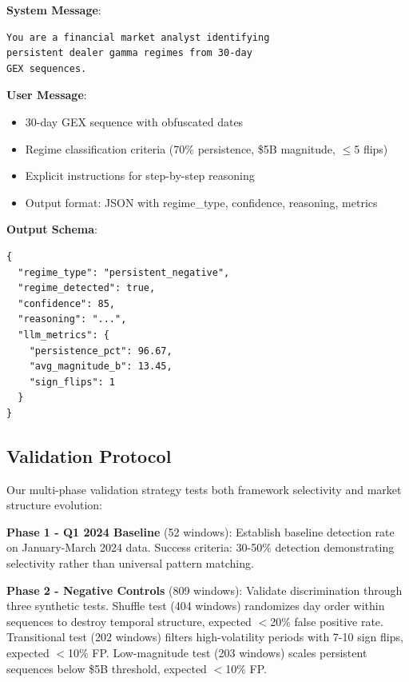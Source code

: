 \noindent\textbf{System Message}:
\begin{verbatim}
You are a financial market analyst identifying
persistent dealer gamma regimes from 30-day
GEX sequences.
\end{verbatim}

\vspace{0.2cm}

\noindent\textbf{User Message}:
\begin{itemize}
\item 30-day GEX sequence with obfuscated dates
\item Regime classification criteria (70\% persistence, \$5B magnitude, $\leq$5 flips)
\item Explicit instructions for step-by-step reasoning
\item Output format: JSON with regime\_type, confidence, reasoning, metrics
\end{itemize}

\vspace{0.2cm}

\noindent\textbf{Output Schema}:
\begin{verbatim}
{
  "regime_type": "persistent_negative",
  "regime_detected": true,
  "confidence": 85,
  "reasoning": "...",
  "llm_metrics": {
    "persistence_pct": 96.67,
    "avg_magnitude_b": 13.45,
    "sign_flips": 1
  }
}
\end{verbatim}

\subsection{Validation Protocol}

Our multi-phase validation strategy tests both framework selectivity and market structure evolution:

\vspace{0.2cm}

\noindent\textbf{Phase 1 - Q1 2024 Baseline} (52 windows): Establish baseline detection rate on January-March 2024 data. Success criteria: 30-50\% detection demonstrating selectivity rather than universal pattern matching.

\vspace{0.2cm}

\noindent\textbf{Phase 2 - Negative Controls} (809 windows): Validate discrimination through three synthetic tests. Shuffle test (404 windows) randomizes day order within sequences to destroy temporal structure, expected $<$20\% false positive rate. Transitional test (202 windows) filters high-volatility periods with 7-10 sign flips, expected $<$10\% FP. Low-magnitude test (203 windows) scales persistent sequences below \$5B threshold, expected $<$10\% FP.

